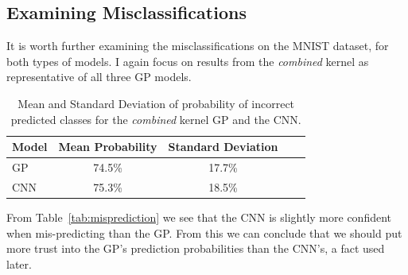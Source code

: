 \documentclass{article}
\begin{document}
\subsection{Examining Misclassifications}

It is worth further examining the misclassifications on the MNIST dataset, for both types of models. I again focus on results from the \textit{combined} kernel as representative of all three GP models.


\begin{table}[htb]
\caption{Mean and Standard Deviation of probability of incorrect predicted classes for the \textit{combined} kernel GP and the CNN.}
\label{tab:misprediction}
\vskip 0.15in
\begin{center}
\begin{small}
\begin{sc}
\begin{tabular}{lcccr}
\toprule
Model			& Mean Probability  	& Standard Deviation  \\
\midrule
GP   			& 74.5\% 		&  17.7\% \\
CNN			 	& 75.3\%		& 18.5\%  \\
\bottomrule
\end{tabular}
\end{sc}
\end{small}
\end{center}
\vskip -0.1in
\label{tab:mispredictions}
\end{table}


From Table~\ref{tab:misprediction} we see that the CNN is slightly more confident when mis-predicting than the GP. From this we can conclude that we should put more trust into the GP's prediction probabilities than the CNN's, a fact used later.


\end{document}

